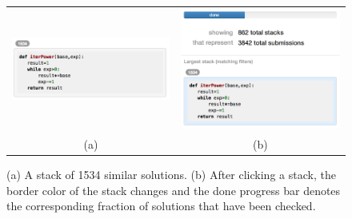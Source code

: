 \begin{figure}[htpb]
\begin{tabular}{c | c}
\begin{minipage}{.5\linewidth}
\centering
\includegraphics[width=0.95\linewidth]{Body/figures/overcode/stackScreenShot.png}
\end{minipage}
&
\begin{minipage}{.5\linewidth}
\centering
\includegraphics[width=0.95\linewidth]{Body/figures/overcode/checkDone.png}
\end{minipage}
\\
(a) & (b)
\end{tabular}
\caption{(a) A stack of 1534 similar  solutions. (b) After clicking a stack, the border color of the stack changes and the done progress bar denotes the corresponding fraction of solutions that have been checked.}
\label{stacks}
\end{figure}

